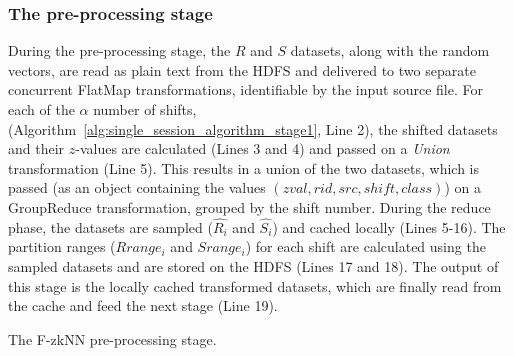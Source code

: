 \subsubsection{The pre-processing stage}
\label{subsec:fzknn3_1}
During the pre-processing stage, the $R$ and $S$ datasets, along with the random vectors, are read as plain text from the HDFS and delivered to two separate concurrent FlatMap transformations, identifiable by the input source file. For each of the $\alpha$ number of shifts, (Algorithm~\ref{alg:single_session_algorithm_stage1}, Line 2), the shifted datasets and their $z$-values are calculated (Lines 3 and 4) and passed on a \textit{Union} transformation (Line 5). This results in a union of the two datasets, which is passed (as an object containing the values $(zval, rid, src, shift, class)$) on a GroupReduce transformation, grouped by the shift number. During the reduce phase, the datasets are sampled ($\hat{R_i}$ and $\hat{S_i}$) and cached locally (Lines 5-16). The partition ranges ($Rrange_i$ and $Srange_i$) for each shift are calculated using the sampled datasets and are stored on the HDFS (Lines 17 and 18). The output of this stage is the locally cached transformed datasets, which are finally read from the cache and feed the next stage (Line 19).

\vspace{-2mm}
\begin{algorithm}[htbp]
	\scriptsize
	\DontPrintSemicolon
	\BlankLine
	\caption{The F-zkNN pre-processing stage.}
	\label{alg:single_session_algorithm_stage1}	
\end{algorithm}
\vspace{-4mm}

